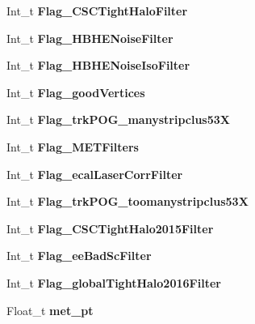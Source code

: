 \begin{DoxyCompactItemize}
Int\+\_\+t {\bfseries Flag\+\_\+\+C\+S\+C\+Tight\+Halo\+Filter}
\item 
\hypertarget{classMiniTree_a7cff1dcda18cc6974912fa925e7f12b7}{}\label{classMiniTree_a7cff1dcda18cc6974912fa925e7f12b7} 
Int\+\_\+t {\bfseries Flag\+\_\+\+H\+B\+H\+E\+Noise\+Filter}
\item 
\hypertarget{classMiniTree_a29a706890cea17657ce2855f176fbd8d}{}\label{classMiniTree_a29a706890cea17657ce2855f176fbd8d} 
Int\+\_\+t {\bfseries Flag\+\_\+\+H\+B\+H\+E\+Noise\+Iso\+Filter}
\item 
\hypertarget{classMiniTree_a9889b04fe98b92c2f5f62178adeb8fdd}{}\label{classMiniTree_a9889b04fe98b92c2f5f62178adeb8fdd} 
Int\+\_\+t {\bfseries Flag\+\_\+good\+Vertices}
\item 
\hypertarget{classMiniTree_a00ca9fe2cae8b85f17a5a7de4c2c9a5a}{}\label{classMiniTree_a00ca9fe2cae8b85f17a5a7de4c2c9a5a} 
Int\+\_\+t {\bfseries Flag\+\_\+trk\+P\+O\+G\+\_\+manystripclus53X}
\item 
\hypertarget{classMiniTree_a4fdaf19bb49fbb616cdee87d0a2c311b}{}\label{classMiniTree_a4fdaf19bb49fbb616cdee87d0a2c311b} 
Int\+\_\+t {\bfseries Flag\+\_\+\+M\+E\+T\+Filters}
\item 
\hypertarget{classMiniTree_a526e1eee6ffb1b957d95a08c1596a14b}{}\label{classMiniTree_a526e1eee6ffb1b957d95a08c1596a14b} 
Int\+\_\+t {\bfseries Flag\+\_\+ecal\+Laser\+Corr\+Filter}
\item 
\hypertarget{classMiniTree_a25ad08154f0744c0dcbeaa487b9c89f2}{}\label{classMiniTree_a25ad08154f0744c0dcbeaa487b9c89f2} 
Int\+\_\+t {\bfseries Flag\+\_\+trk\+P\+O\+G\+\_\+toomanystripclus53X}
\item 
\hypertarget{classMiniTree_a652873a2fa4843e49407aa5df7fb75dd}{}\label{classMiniTree_a652873a2fa4843e49407aa5df7fb75dd} 
Int\+\_\+t {\bfseries Flag\+\_\+\+C\+S\+C\+Tight\+Halo2015\+Filter}
\item 
\hypertarget{classMiniTree_a062f3094b3053453b8f04938747f8ee0}{}\label{classMiniTree_a062f3094b3053453b8f04938747f8ee0} 
Int\+\_\+t {\bfseries Flag\+\_\+ee\+Bad\+Sc\+Filter}
\item 
\hypertarget{classMiniTree_a19c46b498e8278cf1ebb7609f04e6c46}{}\label{classMiniTree_a19c46b498e8278cf1ebb7609f04e6c46} 
Int\+\_\+t {\bfseries Flag\+\_\+global\+Tight\+Halo2016\+Filter}
\item 
\hypertarget{classMiniTree_acd706569613526da62f466d5ece4e4f3}{}\label{classMiniTree_acd706569613526da62f466d5ece4e4f3} 
Float\+\_\+t {\bfseries met\+\_\+pt}
\item 
\hypertarget{classMiniTree_a4d7e12b716e56b22a0c236a6f9aa3b74}{}\label{classMiniTree_a4d7e12b716e56b22a0c236a6f9aa3b74} 

\end{DoxyCompactItemize}
